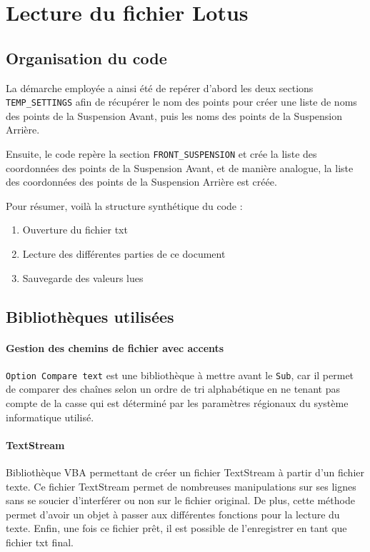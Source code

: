 \section{Lecture du fichier Lotus}
\label{lect_lotus}

\subsection{Organisation du code}

La démarche employée a ainsi été de repérer d'abord les deux sections \texttt{TEMP\_SETTINGS} afin de récupérer le nom des points pour créer une liste de noms des points de la Suspension Avant, puis les noms des points de la Suspension Arrière.
\par Ensuite, le code repère la section \texttt{FRONT\_SUSPENSION} et crée la liste des coordonnées des points de la Suspension Avant, et de manière analogue, la liste des coordonnées des points de la Suspension Arrière est créée.

\par Pour résumer, voilà la structure synthétique du code : 

\begin{enumerate}
    \item Ouverture du fichier txt
    \item Lecture des différentes parties de ce document
    \item Sauvegarde des valeurs lues
\end{enumerate}


\subsection{Bibliothèques utilisées }
\paragraph{Gestion des chemins de fichier avec accents}  \texttt{Option Compare text} est une bibliothèque à mettre avant le \texttt{Sub}, car il permet de comparer des chaînes selon un ordre de tri alphabétique en ne tenant pas compte de la casse qui est déterminé par les paramètres régionaux du système informatique utilisé.

\paragraph{TextStream} Bibliothèque VBA permettant de créer un fichier TextStream à partir d'un fichier texte. Ce fichier TextStream permet de nombreuses manipulations sur ses lignes sans se soucier d'interférer ou non sur le fichier original. De plus, cette méthode permet d'avoir un objet à passer aux différentes fonctions pour la lecture du texte. Enfin, une fois ce fichier prêt, il est possible de l'enregistrer en tant que fichier txt final.

